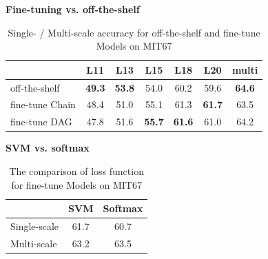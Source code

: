 \documentclass[10pt,twocolumn,letterpaper]{article}
\begin{document}
{\bf Fine-tuning vs. off-the-shelf} 


\begin{table}[htbp]
\begin{center}
\begin{tabular}{|l|c|c|c|c|c|c|}
\hline
& L11 & L13 & L15 & L18 & L20 & multi \\
\hline
off-the-shelf & \textbf{49.3} & \textbf{53.8} & 54.0 & 60.2 & 59.6 & \textbf{64.6} \\
fine-tune Chain   & 48.4 & 51.0 & 55.1 & 61.3 & \textbf{61.7} & 63.5 \\
fine-tune DAG     & 47.8 & 51.6 & \textbf{55.7} & \textbf{61.6} & 61.0 & 64.2	\\
\hline
\end{tabular}
\end{center}
\caption{Single- / Multi-scale accuracy for off-the-shelf and fine-tune Models on MIT67}
\label{table:ft_ots}
\end{table}


{\bf SVM vs. softmax}

\begin{table}[htbp]
\begin{center}
\begin{tabular}{|l|c|c|}
\hline
 & SVM & Softmax \\	
\hline
Single-scale &	61.7 & 60.7 \\
Multi-scale & 63.2 & 63.5   \\

\hline
\end{tabular}
\end{center}
\caption{The comparison of loss function for fine-tune Models on MIT67}
\label{table:loss}
\end{table}
\end{document}
